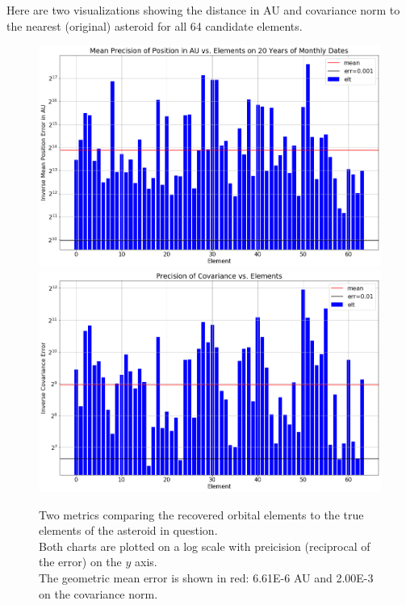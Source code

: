 Here are two visualizations showing the distance in AU and covariance norm to the nearest (original) asteroid for all 64 candidate elements.
\begin{figure}[h]
\begin{center}
\includegraphics[width=1.0\textwidth]{../figs/search_known/unperturbed/near_ast_dist.png}
\includegraphics[width=1.0\textwidth]{../figs/search_known/unperturbed/near_ast_cov.png}
\caption{Two metrics comparing the recovered orbital elements to the true elements of the asteroid in question.\\
Both charts are plotted on a log scale with preicision (reciprocal of the error) on the $y$ axis.\\
The geometric mean error is shown in red: 6.61E-6 AU and 2.00E-3 on the covariance norm.}
\end{center}
\end{figure}
\clearpage

